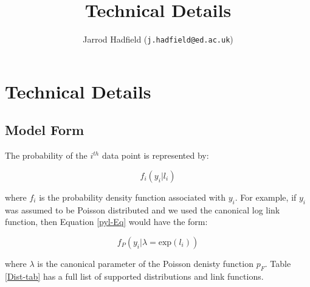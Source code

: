 \documentclass{article}
\title{Technical Details}
\author{Jarrod Hadfield (\texttt{j.hadfield@ed.ac.uk})}
\begin{document}
\maketitle
\else
\chapter{Technical Details}
\label{chap7}
\fi




\section{Model Form}
The probability of the $i^{th}$ data point is represented by:

\begin{equation}
f_{i}(y_{i} | l_{i})
\label{pyl-Eq}
\end{equation}

where $f_{i}$ is the probability density function associated with $y_{i}$. For example, if $y_{i}$ was assumed to be Poisson distributed and we used the canonical log link function, then Equation \ref{pyl-Eq} would have the form:

\begin{equation}
f_{P}\left(y_{i} | \lambda = \textrm{exp}(l_{i})\right)
\label{pyl2-Eq}
\end{equation}

where $\lambda$ is the canonical parameter of the Poisson denisty function $p_{F}$. Table \ref{Dist-tab} has a full list of supported distributions and link functions.\\
\end{document}
